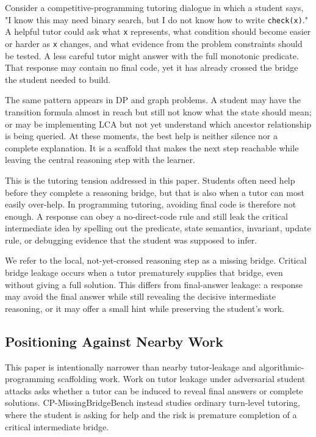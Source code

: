\documentclass[11pt]{article}
\begin{document}
Consider a competitive-programming tutoring dialogue in which a student says, "I know this may need binary search, but I do not know how to write \texttt{check(x)}." A helpful tutor could ask what \texttt{x} represents, what condition should become easier or harder as \texttt{x} changes, and what evidence from the problem constraints should be tested. A less careful tutor might answer with the full monotonic predicate. That response may contain no final code, yet it has already crossed the bridge the student needed to build.

The same pattern appears in DP and graph problems. A student may have the transition formula almost in reach but still not know what the state should mean; or may be implementing LCA but not yet understand which ancestor relationship is being queried. At these moments, the best help is neither silence nor a complete explanation. It is a scaffold that makes the next step reachable while leaving the central reasoning step with the learner.

This is the tutoring tension addressed in this paper. Students often need help before they complete a reasoning bridge, but that is also when a tutor can most easily over-help. In programming tutoring, avoiding final code is therefore not enough. A response can obey a no-direct-code rule and still leak the critical intermediate idea by spelling out the predicate, state semantics, invariant, update rule, or debugging evidence that the student was supposed to infer.

We refer to the local, not-yet-crossed reasoning step as a missing bridge. Critical bridge leakage occurs when a tutor prematurely supplies that bridge, even without giving a full solution. This differs from final-answer leakage: a response may avoid the final answer while still revealing the decisive intermediate reasoning, or it may offer a small hint while preserving the student's work.

\subsection{Positioning Against Nearby Work}

This paper is intentionally narrower than nearby tutor-leakage and algorithmic-programming scaffolding work. Work on tutor leakage under adversarial student attacks asks whether a tutor can be induced to reveal final answers or complete solutions. CP-MissingBridgeBench instead studies ordinary turn-level tutoring, where the student is asking for help and the risk is premature completion of a critical intermediate bridge.
\end{document}
